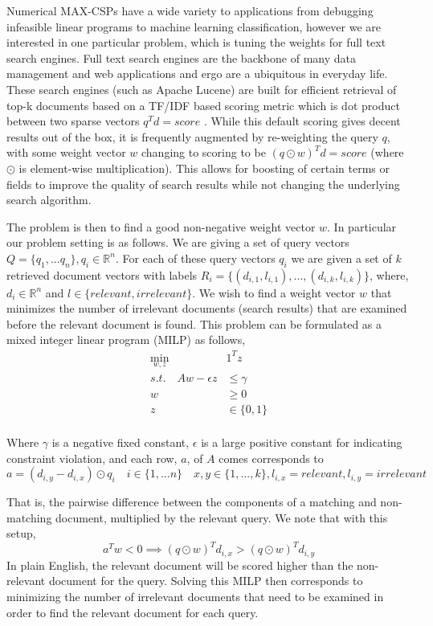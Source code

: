 \documentclass[a4paper]{article}
\begin{document}
Numerical MAX-CSPs have a wide variety to applications from debugging
infeasible linear programs to machine learning classification, however we are
interested in one particular problem, which is tuning the weights for
full text search engines.  Full text search engines are the backbone of 
many data management and web applications and ergo are a ubiquitous in 
everyday life. These search engines (such as Apache Lucene) are built for
efficient retrieval of top-k documents based on a TF/IDF based scoring metric
which is dot product between two sparse vectors $q^Td =
score$\cite{lucene_history} \cite{WAND_paper} \cite{block_max_WAND_paper}.
While this default scoring gives decent results out of the box, it is
frequently augmented by re-weighting the query $q$, with some weight vector $w$
changing to scoring to be $(q\odot w)^Td = score$ (where $\odot$ is element-wise multiplication).
This allows for boosting of certain terms or fields to improve the quality of
search results while not changing the underlying search algorithm. 

The problem is then to find a good non-negative weight vector $w$. In particular our
problem setting is as follows. We are giving a set of query vectors $Q = \{q_1, ... q_n\}, q_i \in \mathds{R}^n$. For each 
of these query vectors $q_i$ we are given a set of $k$ retrieved document vectors with labels $R_i = \{(d_{i,1}, l_{i,1}), ..., (d_{i, k}, l_{i,k})\}$, 
where, $d_i \in \mathds{R}^n$ and $l \in \{relevant, irrelevant\}$.
We wish to find a weight vector $w$ that minimizes the number of irrelevant documents (search results) that are examined 
before the relevant document is found. This problem can be formulated as a mixed integer linear program (MILP) as follows,
\begin{align*}
\min_{w,z}\quad &1^Tz\\
s.t. \quad Aw - \epsilon z &\leq \gamma\\
		w &\geq 0\\
		z &\in \{0,1\}\\
\end{align*}

Where $\gamma$ is a negative fixed constant, $\epsilon$ is a large positive constant for 
indicating constraint violation, and each row, $a$, of $A$ comes corresponds to 
$$
a = (d_{i,y} - d_{i,x}) \odot q_i  \quad i \in \{1,...n\} \quad x,y \in \{1,...,k\}, l_{i,x} = relevant, l_{i,y} = irrelevant
$$

That is, the pairwise difference between the components of a matching and non-matching document, multiplied by the 
relevant query. We note that with this setup, 
$$
a^Tw < 0 \implies (q\odot w)^Td_{i,x} > (q\odot w)^Td_{i,y}
$$
In plain English, the relevant document will be scored higher than the
non-relevant document for the query. Solving this MILP then corresponds to
minimizing the number of irrelevant documents that need to be examined in order
to find the relevant document for each query. 
\end{document}
